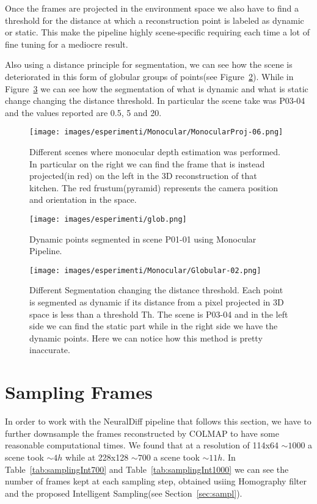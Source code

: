 Once the frames are 
projected in the environment space we also have to find a threshold for the distance at which a reconstruction point is labeled as 
dynamic or static. This make the pipeline highly scene-specific requiring each time a lot of fine tuning for a mediocre result.

Also using a distance principle for segmentation, we can see how the scene is deteriorated in this form of globular groups of points(see Figure~\ref{fig:glob}).
While in Figure~\ref{fig:glob2} we can see how the segmentation of what is dynamic and what is static change changing the distance threshold. In particular the 
scene take was P03-04 and the values reported are 0.5, 5 and 20.

\begin{figure}[H]
    \centering
    \texttt{[image: images/esperimenti/Monocular/MonocularProj-06.png]} 
    \caption{Different scenes where monocular depth estimation was performed. In particular on 
    the right we can find the frame that is instead projected(in red) on the left in the 3D reconstruction of that kitchen.
    The red frustum(pyramid) represents the camera position and orientation in the space.}\label{fig:Monoc}
\end{figure}
\begin{figure}[t]
    \centering
    \texttt{[image: images/esperimenti/glob.png]} 
    \caption{Dynamic points segmented in scene P01-01 using Monocular Pipeline.}\label{fig:glob}
\end{figure}
\begin{figure}[H]
    \centering
    \texttt{[image: images/esperimenti/Monocular/Globular-02.png]} 
    \caption{Different Segmentation changing the distance threshold. Each point is segmented as dynamic if its distance from a pixel 
    projected in 3D space is less than a threshold Th. The scene is P03-04 and in the 
    left side we can find the static part while in the right side we have the dynamic points. Here we can notice 
    how this method is pretty inaccurate.}\label{fig:glob2}
\end{figure}

\section{Sampling Frames}
In order to work with the NeuralDiff pipeline that follows this section, we have to further downsample the frames reconstructed by COLMAP
to have some reasonable computational times. We found that at a resolution of 114x64 $\sim1000$ a scene took  $\sim4h$ while at 228x128 $\sim700$ 
a scene took  $\sim11h$. In Table~\ref{tab:samplingInt700} and Table~\ref{tab:samplingInt1000} we can see the number of frames kept at each sampling 
step, obtained usiing Homography filter and the proposed Intelligent Sampling(see Section~\ref{sec:sampl}).



